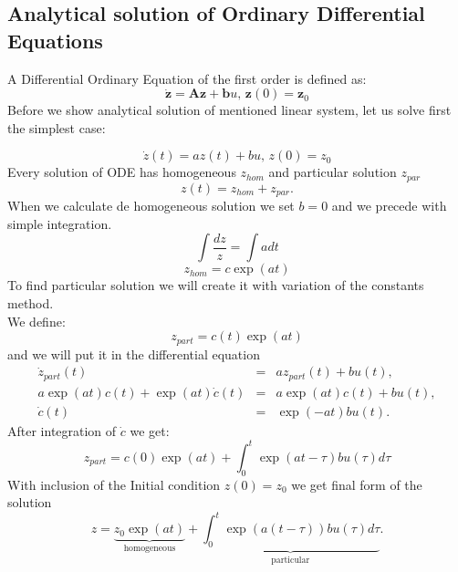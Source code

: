 \subsection{Analytical solution of Ordinary Differential Equations}
A Differential Ordinary Equation of the first order is defined as:
\begin{equation}
\label{eq:diff}
\dot{\mathbf{z}}= \mathbf{A}\mathbf{z} + \mathbf{b}u \texttt{, }\mathbf{z}(0) = \mathbf{z}_0
\end{equation}
Before we show analytical solution of mentioned linear system, let us solve first the simplest case:
 
\begin{equation}
	\dot{z}(t)= az(t) + bu \texttt{, }z(0) = z_0
\end{equation}
Every solution of ODE has homogeneous $z_{hom}$ and particular solution $z_{par}$
\begin{equation}
	z(t) = z_{hom} + z_{par}.
\end{equation}
When we calculate de homogeneous solution we set $b=0$ and we precede with simple integration.
\begin{equation}
	\int\frac{dz}{z} = \int adt
\end{equation}
\begin{equation}
	\boxed{z_{hom}= c\exp(at)}
\end{equation}
To find particular solution we will create it with variation of the constants method.\\
We define:
\begin{equation}
	z_{part}= c(t)\exp(at)
\end{equation}
and we will put it in the differential equation
\begin{eqnarray}
	\dot{z}_{part}(t)&=& az_{part}(t) + bu(t),\\
	a\exp(at)c(t)+ \exp(at)\dot{c}(t)&=& a\exp(at)c(t) + bu(t),\\
	\dot{c}(t) &=& \exp(-at)bu(t).
\end{eqnarray}
After integration of $\dot{c}$ we get:
\begin{equation}
	\boxed{z_{part}= c(0)\exp(at) + \int^t_0 \exp(at-\tau)bu(\tau)d\tau}
\end{equation}
With inclusion of the Initial condition $z(0) = z_0$ we get final form of the solution \\
\begin{equation}
	\boxed{z= \underbrace{z_0\exp(at)}_\text{homogeneous} + \underbrace{\int^t_0 \exp(a(t-\tau))bu(\tau)d\tau}_\text{particular} }.
\end{equation}
